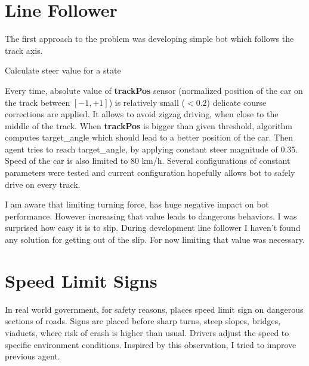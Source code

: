 \documentclass[declaration,shortabstract,english,inz]{iithesis}
\begin{document}
\section{Line Follower}

The first approach to the problem was developing simple bot which follows the track axis.


\begin{algorithm}
    \caption{Calculate steer value for a state}
    \label{alg:steer}
    \begin{algorithmic}
        \ELSE 
        \ENDIF
    \end{algorithmic}
\end{algorithm}

Every time, absolute value of \textbf{trackPos} sensor (normalized position of the car on the track between $ [-1, +1] $) is relatively small ($ < 0.2 $) delicate course corrections are applied. It allows to avoid zigzag driving, when close to the middle of the track.
When \textbf{trackPos} is bigger than given threshold, algorithm computes target\_angle which should lead to a better position of the car.
Then agent tries to reach target\_angle, by applying constant steer magnitude of $0.35$.
Speed of the car is also limited to 80 km/h.
Several configurations of constant parameters were tested and current configuration hopefully allows bot to safely drive on every track.


I am aware that limiting turning force, has huge negative impact on bot performance.
However increasing that value leads to dangerous behaviors.
I was surprised how easy it is to slip.
During development line follower I haven't found any solution for getting out of the slip.
For now limiting that value was necessary.

\section{Speed Limit Signs}

In real world government, for safety reasons, places speed limit sign on dangerous sections of roads.
Signs are placed before sharp turns, steep slopes, bridges, viaducts, where risk of crash is higher than usual.
Drivers adjust the speed to specific environment conditions.
Inspired by this observation, I tried to improve previous agent.
\end{document}
